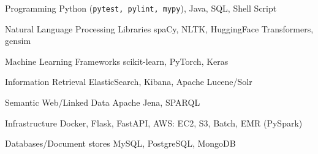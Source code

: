 

\begin{cvskills}

  \cvskill
    {Programming} %
    {Python (\texttt{pytest, pylint, mypy}), Java, SQL, Shell Script} %

  \cvskill
    {Natural Language Processing Libraries} %
    {spaCy, NLTK, HuggingFace Transformers, gensim} %

  \cvskill
    {Machine Learning Frameworks} %
    {scikit-learn, PyTorch, Keras} %

  \cvskill
    {Information Retrieval} %
    {ElasticSearch, Kibana, Apache Lucene/Solr} %

  \cvskill
    {Semantic Web/Linked Data} %
    {Apache Jena, SPARQL} %

  \cvskill
    {Infrastructure} %
    {Docker, Flask, FastAPI, AWS: EC2, S3, Batch, EMR (PySpark)} %

  \cvskill
    {Databases/Document stores} %
    {MySQL, PostgreSQL, MongoDB} %

\end{cvskills}
